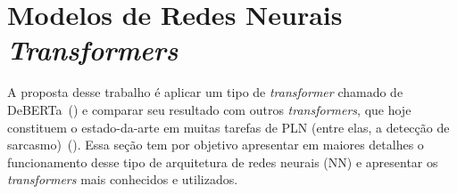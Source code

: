 \section{Modelos de Redes Neurais \textit{Transformers}}%
\label{sec:modelos_de_redes_neurais_transformers}

A proposta desse trabalho é aplicar um tipo de \textit{transformer} chamado de
DeBERTa~(\cite{he-etal:2020:deberta}) e comparar seu resultado com outros
\textit{transformers}, que hoje constituem o estado-da-arte em muitas tarefas de
PLN (entre elas, a detecção de
sarcasmo)~(\cite{joshi:2017:sarcasm-detection-survey}).  Essa seção tem por
objetivo apresentar em maiores detalhes o funcionamento desse tipo de
arquitetura de redes neurais (NN) e apresentar os \textit{transformers} mais
conhecidos e utilizados.




